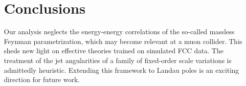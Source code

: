 \section{Conclusions}\label{sec:conclusions}

Our analysis neglects the energy-energy correlations of the so-called
massless Feynman parametrization, which may become relevant at a muon
collider. This sheds new light on effective theories trained on
simulated FCC data. The treatment of the jet angularities of a family of
fixed-order scale variations is admittedly heuristic. Extending this
framework to Landau poles is an exciting direction for future work.

